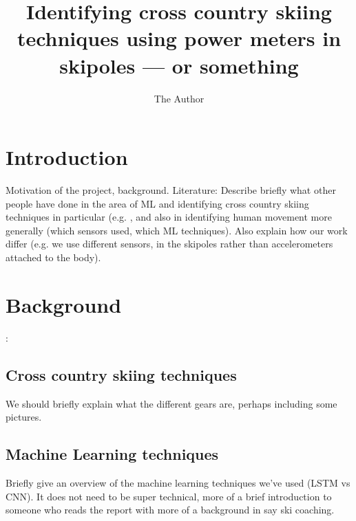 \documentclass[11pt]{article}
\title{Identifying cross country skiing techniques using power meters in skipoles --- or something}
\author{The Author}
\begin{document}
\maketitle
{}


\section{Introduction}
Motivation of the project, background.
Literature: Describe briefly what other people have done in the area of ML and identifying cross country skiing techniques in particular (e.g. \cite{Rindal2017, Stoggl2014}, and also in identifying human movement more generally (which sensors used, which ML techniques). Also explain how our work differ (e.g. we use different sensors, in the skipoles rather than accelerometers attached to the body). 

\section{Background}:
\subsection{Cross country skiing techniques}
We should briefly explain what the different gears are, perhaps including some pictures.

\subsection{Machine Learning techniques}
Briefly give an overview of the machine learning techniques we've used (LSTM vs CNN). It does not need to be super technical, more of a brief introduction to someone who reads the report with more of a background in say ski coaching. 
\end{document}
